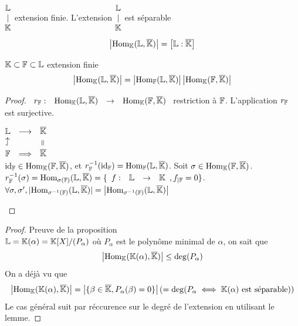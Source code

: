 \documentclass[]{report}
\begin{document}
    \begin{prop}{}{}
        $\begin{matrix} \mathbb{L}\\ |\\ \mathbb{K} \end{matrix}$ extension finie. L'extension $\begin{matrix} \mathbb{L}\\ |\\ \mathbb{K} \end{matrix}$ est séparable \ssi
        \[\left| \text{Hom}_{\mathbb{K}}(\mathbb{L},\overline{\mathbb{K}})\right|=\left[\mathbb{L}:\overline{\mathbb{K}}\right]\]
    \end{prop}

    \begin{lm}{}{}
        $\mathbb{K}\subset\mathbb{F}\subset \mathbb{L}$ extension finie
        \[\left|\text{Hom}_{\mathbb{K}}(\mathbb{L},\overline{\mathbb{K}})\right|=\left|\text{Hom}_{\mathbb{F}}(\mathbb{L},\overline{\mathbb{K}})\right|\left|\text{Hom}_{\mathbb{K}}(\mathbb{F},\overline{\mathbb{K}})\right|\]
    \end{lm}

    \begin{proof}
        $\begin{array}{ccccc} r_{\mathbb{F}} : & \text{Hom}_{\mathbb{K}}(\mathbb{L},\overline{\mathbb{K}}) & \to & \text{Hom}_{\mathbb{K}}(\mathbb{F},\overline{\mathbb{K}}) \end{array}$ restriction à $\mathbb{F}$. L'application $r_{\mathbb{F}}$ est surjective.\\
        \begin{center}
            $\begin{matrix}
                \La&\longrightarrow&\overline{\K}\\
                \text{\rotatebox{90}{$\hookrightarrow$}}&&\text{\rotatebox{90}{$=$}}\\
                \Fa&\Longrightarrow&\overline{\K}
            \end{matrix}$\\
            $\text{id}_{\mathbb{F}}\in \text{Hom}_{\mathbb{K}}(\mathbb{F},\overline{\mathbb{K}})$, et $r_{\mathbb{F}}^{-1}(\text{id}_{\mathbb{F}})=\text{Hom}_{\mathbb{F}}(\mathbb{L},\overline{\mathbb{K}})$. Soit $\sigma\in \text{Hom}_{\mathbb{K}}(\mathbb{F},\overline{\mathbb{K}})$. $r_{\mathbb{F}}^{-1}(\sigma)=\text{Hom}_{\sigma(\mathbb{F})}(\mathbb{L},\overline{\mathbb{K}})=\{\begin{array}{ccccc} f : & \mathbb{L} & \to & \mathbb{K} \end{array},f_{|\mathbb{F}}=0\}$.\\
            $\forall \sigma,\sigma',|\text{Hom}_{\sigma^{-1}(\mathbb{F})}(\mathbb{L},\overline{\mathbb{K}})|=\left|\text{Hom}_{\sigma^{-1}(\mathbb{F})}(\mathbb{L},\overline{\mathbb{K}})\right|$
        \end{center}
    \end{proof}

    \begin{proof}{Preuve de la proposition}{}\\
        $\mathbb{L}=\mathbb{K}(\alpha)=\mathbb{K}[X]/(P_\alpha)$ où $P_\alpha$ est le polynôme minimal de $\alpha$, on sait que 
        \[\left|\text{Hom}_{\mathbb{K}}(\mathbb{K}(\alpha),\overline{\mathbb{K}})\right|\le \deg (P_\alpha)\]
        On a déjà vu que
        \[\left|\text{Hom}_{\mathbb{K}}(\mathbb{K}(\alpha),\overline{\mathbb{K}})\right|=\left|\{\beta\in \overline{\mathbb{K}},P_\alpha(\beta)=0\}\right|(=\deg (P_\alpha\iff\mathbb{K}(\alpha)\text{ est séparable}))\]
        Le cas général suit par réccurence sur le degré de l'extension en utilisant le lemme.
    \end{proof}
\end{document}
